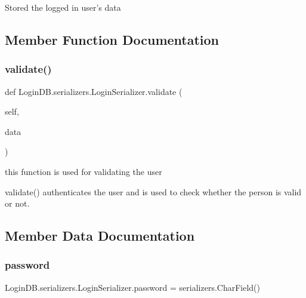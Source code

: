 \begin{DoxyVerb}Stored the logged in user's data
\end{DoxyVerb}
 

\subsection{Member Function Documentation}
\mbox{\label{class_login_d_b_1_1serializers_1_1_login_serializer_a0e1bcc1a6f5008b631d130a48e589def}} 
\subsubsection{\texorpdfstring{validate()}{validate()}}
{\footnotesize\ttfamily def Login\+D\+B.\+serializers.\+Login\+Serializer.\+validate (\begin{DoxyParamCaption}\item[{}]{self,  }\item[{}]{data }\end{DoxyParamCaption})}



this function is used for validating the user 

\begin{DoxyVerb}validate() authenticates the user and is used to check whether the person is valid or not.
\end{DoxyVerb}
 

\subsection{Member Data Documentation}
\mbox{\label{class_login_d_b_1_1serializers_1_1_login_serializer_a244a561f5a08720e6bb5a2443594b856}} 
\subsubsection{\texorpdfstring{password}{password}}
{\footnotesize\ttfamily Login\+D\+B.\+serializers.\+Login\+Serializer.\+password = serializers.\+Char\+Field()\hspace{0.3cm}{\ttfamily [static]}}

